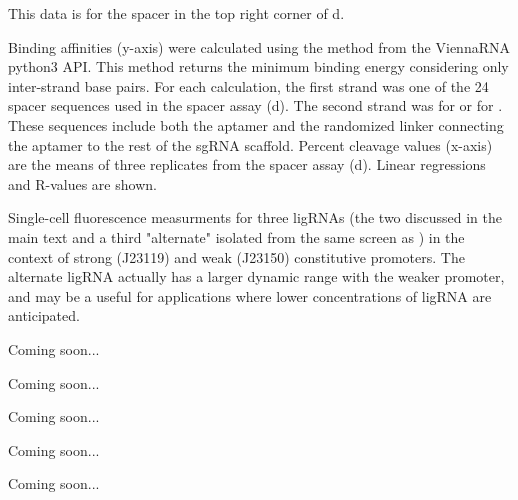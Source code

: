 \documentclass[10pt,oneside]{article}
\begin{document}


      This data is for the spacer in the top right corner of d.  



     Binding affinities (y-axis) were calculated using the  method from the ViennaRNA python3 API.  This method returns the minimum binding energy considering only inter-strand base pairs.  For each calculation, the first strand was one of the 24  spacer sequences used in the \invitro{} spacer assay (d).  The second strand was  for \ligrnaF{} or  for \ligrnaB{}.  These sequences include both the aptamer and the randomized linker connecting the aptamer to the rest of the sgRNA scaffold.  Percent cleavage values (x-axis) are the means of three replicates from the \invitro{} spacer assay (d).  Linear regressions and R-values are shown.



      Single-cell fluorescence measurments for three ligRNAs (the two discussed in the main text and a third "alternate" isolated from the same screen as \ligrnaF{}) in the context of strong (J23119) and weak (J23150) constitutive promoters.  The alternate ligRNA actually has a larger dynamic range with the weaker promoter, and may be a useful for applications where lower concentrations of ligRNA are anticipated.


    Coming soon...


    Coming soon...


    Coming soon...


    Coming soon...


    Coming soon...

\printbibliography[title=References]
\end{document}

